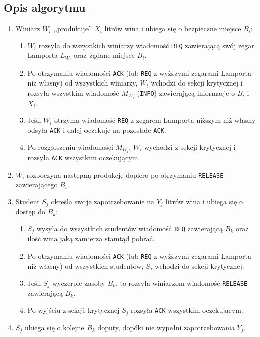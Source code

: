 \documentclass[12pt, a4paper, oneside]{article}
\begin{document}
\subsection*{Opis algorytmu}

\begin{enumerate}
    \item Winiarz $ W_{i} $ ,,produkuje'' $ X_{i} $ litrów wina i ubiega się o bezpieczne miejsce $ B_{i} $:
          \begin{enumerate}
              \item  $ W_{i} $ rozsyła do wszystkich winiarzy wiadomość \texttt{REQ} zawierającą swój zegar Lamporta $ L_{W_{i}} $ oraz żądane miejsce $ B_{i} $.
              \item Po otrzymaniu wiadomości \texttt{ACK} (lub \texttt{REQ} z wyższymi zegarami Lamporta niż własny) od wszystkich winiarzy,
                    $ W_{i} $ wchodzi do sekcji krytycznej i rozsyła wszystkim wiadomość $ M_{W_{i}} $ (\texttt{INFO}) zawierającą informacje o $ B_{i} $ i $ X_{i} $.
              \item Jeśli $ W_{i} $ otrzyma wiadomość \texttt{REQ} z zegarem Lamporta niższym niż własny odsyła \texttt{ACK} i dalej oczekuje na pozostałe \texttt{ACK}.
              \item Po rozgłoszeniu wiadomości $ M_{W_{i}} $, $ W_{i} $ wychodzi z sekcji krytycznej i rozsyła \texttt{ACK} wszystkim oczekującym.
          \end{enumerate}
    \item $ W_{i} $ rozpoczyna następną produkcję dopiero po otrzymaniu \texttt{RELEASE} zawierającego $ B_{i} $.

    \item Student $ S_{j} $ określa swoje zapotrzebowanie na $ Y_{j} $ litrów wina i ubiega się o dostęp do $ B_{k} $:
          \begin{enumerate}
              \item $ S_{j} $ wysyła do wszystkich studentów wiadomość \texttt{REQ} zawierającą $ B_{k} $ oraz ilość wina jaką zamierza stamtąd pobrać.
              \item Po otrzymaniu wiadomości \texttt{ACK} (lub \texttt{REQ} z wyższymi zegarami Lamporta niż własny) od wszystkich studentów,
                    $ S_{j} $ wchodzi do sekcji krytycznej.
              \item Jeśli $ S_{j} $ wyczerpie zasoby $ B_{k} $, to rozsyła winiarzom wiadomość \texttt{RELEASE} zawierającą $ B_{k} $.
              \item Po wyjściu z sekcji krytycznej $ S_{j} $ rozsyła \texttt{ACK} wszystkim oczekującym.
          \end{enumerate}
    \item $ S_{j} $ ubiega się o kolejne $ B_{k} $ doputy, dopóki nie wypełni zapotrzebowania $ Y_{j} $.
\end{enumerate}
\end{document}
